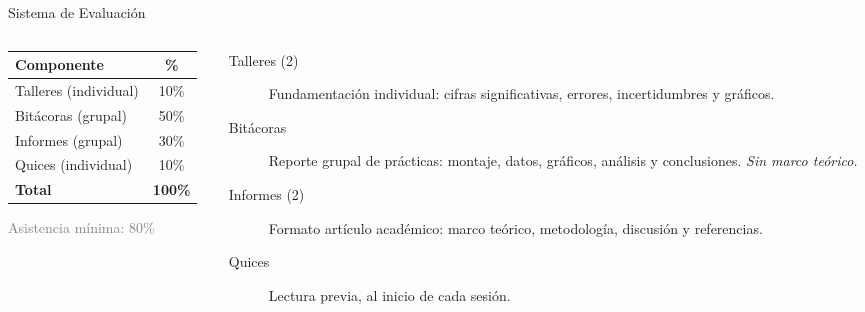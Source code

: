 \documentclass[aspectratio=169,xcolor=dvipsnames]{beamer}
\begin{document}
\begin{frame}{Sistema de Evaluación}
	\vspace{-0.2cm}
	\begin{columns}[T]
		\begin{column}{0.38\textwidth}
			\centering
			\renewcommand{\arraystretch}{1.3}
			\begin{tabular}{@{}lc@{}}
				\toprule
				\textbf{Componente} & \textbf{\%} \\
				\midrule
				Talleres (individual) & 10\% \\
				Bitácoras (grupal)    & 50\% \\
				Informes (grupal)     & 30\% \\
				Quices (individual)   & 10\% \\
				\midrule
				\textbf{Total} & \textbf{100\%} \\
				\bottomrule
			\end{tabular}
			
			\vspace{0.3cm}
			{\small \textcolor{gray}{Asistencia mínima: 80\%}}
		\end{column}
		
		\begin{column}{0.58\textwidth}
			\small
			\begin{description}
				\item[Talleres (2)] Fundamentación individual: cifras significativas, errores, incertidumbres y gráficos.
				\vspace{0.15cm}
				\item[Bitácoras] Reporte grupal de prácticas: montaje, datos, gráficos, análisis y conclusiones. \textit{Sin marco teórico.}
				\vspace{0.15cm}
				\item[Informes (2)] Formato artículo académico: marco teórico, metodología, discusión y referencias.
				\vspace{0.15cm}
				\item[Quices] Lectura previa, al inicio de cada sesión.
			\end{description}
		\end{column}
	\end{columns}
\end{frame}
\end{document}
